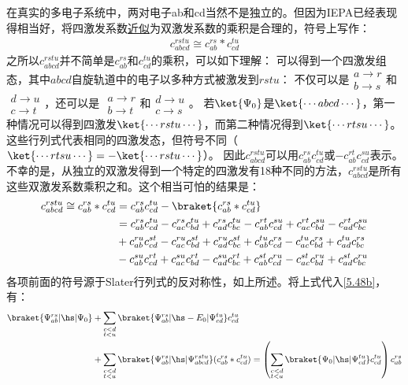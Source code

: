 在真实的多电子系统中，两对电子ab和cd当然不是独立的。但因为IEPA已经表现得相当好，将四激发系数\uline{近似}为双激发系数的乘积是合理的，符号上写作：
\begin{align}
    c_{abcd}^{rstu}\cong c_{ab}^{rs}*c_{cd}^{tu}
\end{align}
之所以$c_{abcd}^{rstu}$并不简单是$c_{ab}^{rs}$和$c_{cd}^{tu}$的乘积，可以如下理解：
可以得到一个四激发组态，其中$abcd$自旋轨道中的电子以多种方式被激发到$rstu$：
不仅可以是$\begin{matrix}a\rightarrow r\\b\rightarrow s\end{matrix}$和$\begin{matrix}d\rightarrow u\\c\rightarrow t\end{matrix}$，还可以是
$\begin{matrix}a\rightarrow r\\b\rightarrow t \end{matrix}$和$\begin{matrix}d\rightarrow u\\c\rightarrow s\end{matrix}$。
若$\ket{\Psi_0}$是$\ket{\cdots abcd\cdots}$，第一种情况可以得到四激发$\ket{\cdots rstu\cdots}$，而第二种情况得到$\ket{\cdots rtsu\cdots}$。
这些行列式代表相同的四激发态，但符号不同（$\ket{\cdots rtsu\cdots}=-\ket{\cdots rstu\cdots}$）。
因此$c_{abcd}^{rstu}$可以用$c_{ab}^{rs}c_{cd}^{tu}$或$-c_{ab}^{rt}c_{cd}^{su}$表示。
不幸的是，从独立的双激发得到一个特定的四激发有18种不同的方法，$c_{abcd}^{rstu}$是所有这些双激发系数乘积之和。这个相当可怕的结果是：
\begin{align}
    \label{5.53}
    c_{abcd}^{rstu} \cong c_{ab}^{rs}*c_{cd}^{tu}&=c_{ab}^{rs}c_{cd}^{tu}-\braket{c_{ab}^{rs}*c_{cd}^{tu}}\notag\\
    &=c_{ab}^{rs}c_{cd}^{tu}-c_{ac}^{rs}c_{bd}^{tu}+c_{ad}^{rs}c_{bc}^{tu}-c_{ab}^{rt}c_{cd}^{su}+c_{ac}^{rt}c_{bd}^{su}-c_{ad}^{rt}c_{bc}^{su}\notag \\
    &+c_{ab}^{ru}c_{cd}^{st}-c_{ac}^{ru}c_{bd}^{st}+c_{ad}^{ru}c_{bc}^{st}+c_{ab}^{tu}c_{cd}^{rs}-c_{ac}^{tu}c_{bd}^{rs}+c_{ad}^{tu}c_{bc}^{rs}\notag \\
    &-c_{ab}^{su}c_{cd}^{rt}+c_{ac}^{su}c_{bd}^{rt}-c_{ad}^{su}c_{bc}^{rt}+c_{ab}^{st}c_{cd}^{ru}-c_{ac}^{st}c_{bd}^{ru}+c_{ad}^{st}c_{bc}^{ru}
\end{align}
各项前面的符号源于Slater行列式的反对称性，如上所述。将上式代入\autoref{5.48b}，有：
\begin{align}
    \label{5.54}
    \braket{\Psi_{ab}^{rs}|\hs|\Psi_0}&+\sum_{\substack{c<d\\t<u}}\braket{\Psi_{ab}^{rs}|\hs-E_0|\Psi_{cd}^{tu}}c_{cd}^{tu} \notag\\
    &+\sum_{\substack{c<d\\t<u}}\braket{\Psi_{ab}^{rs}|\hs|\Psi_{abcd}^{rstu}}(c_{ab}^{rs}*c_{cd}^{tu})
    =\left(\sum_{\substack{c<d\\t<u}}\braket{\Psi_0|\hs|\Psi_{cd}^{tu}}c_{cd}^{tu}\right) c_{ab}^{rs}
\end{align}

